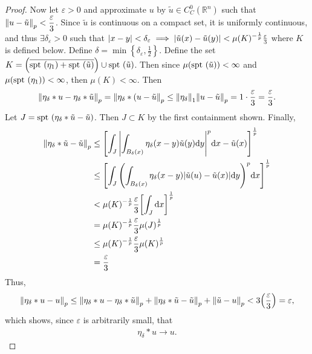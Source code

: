 \documentclass{article} %
\theoremstyle{plain}
\newcommand{\E}{\varepsilon}
\def\Rl{\mathbb{R}}
\newcommand{\spt}{\text{\rm spt }}
\numberwithin{equation}{section} %
\numberwithin{figure}{section} %
\numberwithin{table}{section} %
\begin{document}
\begin{proof}
    Now let $\E > 0$ and approximate $u$ by $\tilde{u} \in C_C^0(\Rl^n)$ such that $\norm{u - \tilde{u}}_p < \dfrac{\E}{3}$.  Since $\tilde{u}$ is continuous on a compact set, it is uniformly continuous, and thus $\exists \delta_\E > 0$ such that $\abs{x-y} < \delta_\E \implies \abs{\tilde{u}(x) - \tilde{u}(y)} < \mu(K)^{-\frac{1}{p}}\frac{\E}{3}$ where $K$ is defined below.  Define $\delta = \min\left\{\delta_\E, \frac{1}{2}\right\}$.  Define the set $K = \qty(\overline{\spt(\eta_1) + \spt(\tilde{u})})\cup \spt(\tilde{u})$.  Then since $\mu(\spt(\tilde{u})) < \infty$ and $\mu(\spt(\eta_1)) < \infty$, then $\mu(K) < \infty$.  Then
    \begin{align*}
        \norm{\eta_\delta * u - \eta_\delta * \tilde{u}}_p = \norm{\eta_\delta * (u - \tilde{u}}_p \leq \norm{\eta_\delta}_1\norm{u - \tilde{u}}_p = 1 \cdot \frac{\E}{3} = \frac{\E}{3}.
    \end{align*}
    Let $J = \spt(\eta_\delta * \tilde{u} - \tilde{u})$.  Then $J \subset K$ by the first containment shown.  Finally,
    \begin{align*}
        \norm{\eta_\delta * \tilde{u} - \tilde{u}}_p &\leq \qty[\int_J \abs{\int_{B_\delta(x)}\eta_\delta(x-y)\tilde{u}(y)\dd y}^p \dd x - \tilde{u}(x)]^{\frac{1}{p}} \\
        &\leq \qty[\int_J\qty(\int_{B_\delta(x)}\eta_\delta(x - y)\abs{\tilde{u}(u) - \tilde{u}(x)}\dd y)^p \dd x]^{\frac{1}{p}} \\
        &< \mu(K)^{-\frac{1}{p}}\frac{\E}{3}\qty[\int_J \dd x]^{\frac{1}{p}} \\
        &= \mu(K)^{-\frac{1}{p}}\frac{\E}{3}\mu(J)^{\frac{1}{p}} \\
        &\leq \mu(K)^{-\frac{1}{p}}\frac{\E}{3}\mu(K)^{\frac{1}{p}} \\
        &= \frac{\E}{3}
    \end{align*}
    Thus,
    \begin{align*}
        \norm{\eta_\delta * u - u}_p \leq \norm{\eta_\delta * u - \eta_\delta * \tilde{u}}_p + \norm{\eta_\delta * \tilde{u} - \tilde{u}}_p + \norm{\tilde{u} - u}_p < 3\qty(\frac{\E}{3}) = \E,
    \end{align*}
    which shows, since $\E$ is arbitrarily small, that
    \begin{align*}
        \eta_\delta * u \rightarrow u.
    \end{align*}
\end{proof}
\end{document}
